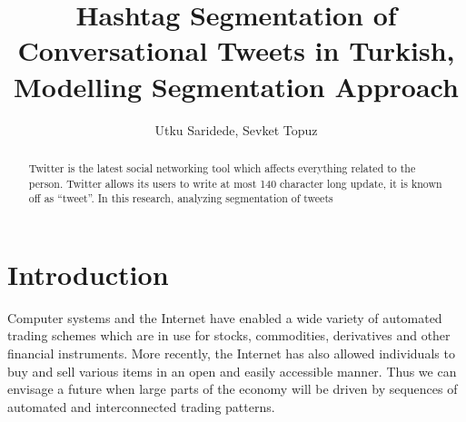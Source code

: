 \documentclass{comjnl}
\begin{document}
\title[Hashtag Segmentation of Conversational Tweets in Turkish]{Hashtag Segmentation of Conversational Tweets in Turkish, Modelling Segmentation Approach}
\author{Utku Saridede, Sevket Topuz}
 






\begin{abstract}
Twitter is the latest social networking tool which affects everything related to the person.
Twitter allows its users to write at most 140 character long update, it is known off as 
``tweet''. In this research, analyzing segmentation of tweets 
\end{abstract}

\maketitle


\section{Introduction}

Computer systems and the Internet have enabled a wide variety of
automated trading schemes which are in use for stocks,
commodities, derivatives and other financial instruments. More
recently, the Internet has also allowed individuals to buy and
sell various items in an open and easily accessible manner. Thus
we can envisage a future when large parts of the economy will be
driven by sequences of automated and interconnected trading
patterns.
\end{document}

